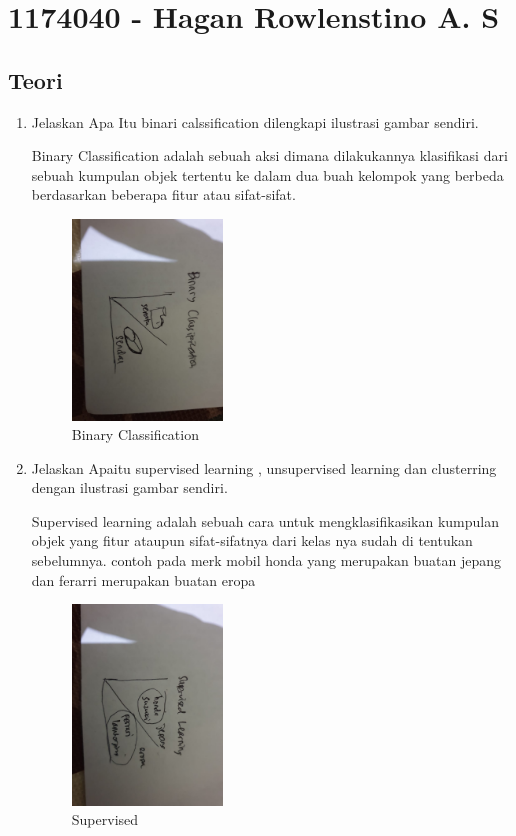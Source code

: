 \section{1174040 - Hagan Rowlenstino A. S}
    \subsection{Teori}
        \begin{enumerate}
            \item Jelaskan Apa Itu binari calssification dilengkapi ilustrasi gambar sendiri.\par
            Binary Classification adalah sebuah aksi dimana dilakukannya klasifikasi dari sebuah kumpulan objek tertentu ke dalam dua buah kelompok yang berbeda berdasarkan beberapa fitur atau sifat-sifat.
            \begin{figure}[H]
                \includegraphics[width=4cm]{figures/1174040/chapter2/binary.jpeg}
                \centering
                \caption{Binary Classification}
            \end{figure}
            
            \item Jelaskan Apaitu supervised learning , unsupervised learning dan clusterring dengan ilustrasi gambar sendiri.\par
            Supervised learning adalah sebuah cara untuk mengklasifikasikan kumpulan objek yang fitur ataupun sifat-sifatnya dari kelas nya sudah di tentukan sebelumnya. contoh pada merk mobil honda yang merupakan buatan jepang dan ferarri merupakan buatan eropa\par
            \begin{figure}[H]
                \includegraphics[width=4cm]{figures/1174040/chapter2/supervised.jpeg}
                \centering
                \caption{Supervised}
            \end{figure}


\end{enumerate}
